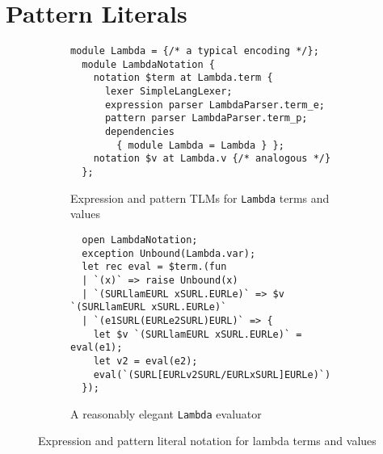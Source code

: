 \documentclass[acmsmall]{acmart}
\makeatletter
\renewcommand{\subsubsection}{%
  \@startsection{subsubsection}{3}%
  {\z@}{1ex \@plus .2ex \@minus .2ex}{-1em}%
  {\normalfont\normalsize\bfseries}%
}
\newcommand{\li}[1]{\lstinline[basicstyle=\ttfamily\fontsize{9pt}{1em}\selectfont]{#1}}
\newcommand{\lismall}[1]{\lstinline[basicstyle=\ttfamily\fontsize{9pt}{1em}\selectfont]{#1}}
\makeatother
\begin{document}



\section{Pattern Literals}
\label{sec:sptsms}

\begin{figure}[t]
\begin{subfigure}[t]{0.55\textwidth}
\begin{lstlisting}[morekeywords={expression}]
  module Lambda = {/* a typical encoding */};
  module LambdaNotation {
    notation $term at Lambda.term { 
      lexer SimpleLangLexer;
      expression parser LambdaParser.term_e;
      pattern parser LambdaParser.term_p;
      dependencies 
        { module Lambda = Lambda } };
    notation $v at Lambda.v {/* analogous */}
  };
\end{lstlisting}
\vspace{-6px}
\caption{Expression and pattern TLMs for \lismall{Lambda} terms and values}
\label{fig:lam}
\vspace{2px}
\end{subfigure}
\hfill
\begin{subfigure}[t]{0.42\textwidth}
\begin{lstlisting}
  open LambdaNotation;
  exception Unbound(Lambda.var);
  let rec eval = $term.(fun 
  | `(x)` => raise Unbound(x)
  | `(SURLlamEURL xSURL.EURLe)` => $v `(SURLlamEURL xSURL.EURLe)`
  | `(e1SURL(EURLe2SURL)EURL)` => {
    let $v `(SURLlamEURL xSURL.EURLe)` = eval(e1);
    let v2 = eval(e2);
    eval(`(SURL[EURLv2SURL/EURLxSURL]EURLe)`) 
  });
\end{lstlisting}
\vspace{-6px}
\caption{A reasonably elegant \lismall{Lambda} evaluator}
\label{fig:lam-eval}
\end{subfigure}
\vspace{2px}
\caption{Expression and pattern literal notation for lambda terms and values}
\vspace{-8px}
\label{fig:lam-example}
\end{figure}
\end{document}
